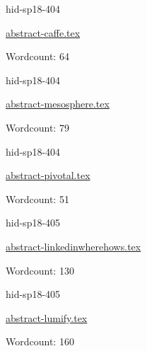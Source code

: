 

\begin{IU}

hid-sp18-404

\href{https://github.com/cloudmesh-community/hid-sp18-404/blob/master//technology/abstract-caffe.tex}{abstract-caffe.tex}

 

Wordcount: 64

\end{IU}



\begin{IU}

hid-sp18-404

\href{https://github.com/cloudmesh-community/hid-sp18-404/blob/master//technology/abstract-mesosphere.tex}{abstract-mesosphere.tex}

 

Wordcount: 79

\end{IU}



\begin{IU}

hid-sp18-404

\href{https://github.com/cloudmesh-community/hid-sp18-404/blob/master//technology/abstract-pivotal.tex}{abstract-pivotal.tex}

 

Wordcount: 51

\end{IU}



\begin{IU}

hid-sp18-405

\href{https://github.com/cloudmesh-community/hid-sp18-405/blob/master//technology/abstract-linkedinwherehows.tex}{abstract-linkedinwherehows.tex}

 

Wordcount: 130

\end{IU}



\begin{IU}

hid-sp18-405

\href{https://github.com/cloudmesh-community/hid-sp18-405/blob/master//technology/abstract-lumify.tex}{abstract-lumify.tex}

 

Wordcount: 160

\end{IU}

